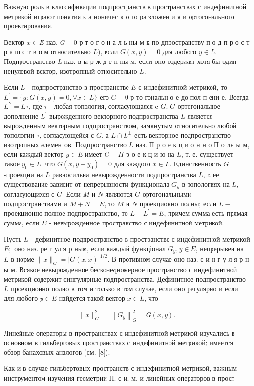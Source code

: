 \documentclass[10pt]{article}
\begin{document}
Важную роль в классификации подпространств в пространствах с индефинитной метрикой играют понятия к а ноничес к о го ра зложен и я и ортогонального проектирования.



Вектор $x \in E$ наз. $G-0$ р т о г о н а л ь ны м к по дпространству п о д п р о с т р а ш с т в о м относительно $L)$, если $G(x, y)=0$ для любого $y \in L$. Подпространство $L$ наз. в ы р ж д е н ны м, если оно содержит хотя бы один ненулевой вектор, изотропный относительно $L$.



Если $L$ - подпространство в пространстве $E$ с индефинитной метрикой, то $L^{\prime}=\{y: G(x, y)=0, \forall x \in L\}$ его $G-0$ р то гональн о е до пол п ени е. Всегда $L^{\prime \prime}=L \tau$, где $\tau$ - любая топология, согласующаяся c $G$. $G$-ортогональное дополнение $L^{\prime}$ вырожденного векторного подпространства $L$ является вырожденным векторным подпространством, замкнутым относительно любой топологии $\tau$, согласующейся с $G$, а $L \cap L^{\perp}$ есть векторное подпространство изотропных әлементов. Подпространство $L$ наз. П р о е к ц и о н н о П о лн ы м, если каждый вектор $y \in E$ имеет $G-\Pi$ р о е к ц и ю на $L$, т. е. существует такое $y_{0} \in L$, что $G\left(x, y-y_{0}\right)=0$ для каждого $x \in L$. Единственность $G$-проекции на $L$ равносильна невырожденности подпространства $L$, a ее существование зависит от непрерывности функционала $G_{y}$ в топологиях на $L$, согласующихся с $G$. Если $M$ и $N$ являются $G$-ортогональными подпространствами и $M+N=E$, то $M$ и $N$ проекционно полны; если $L-$ проекционно полное подпространство, то $L+L^{\prime}=E$, причем сумма есть прямая сумма, если $E$ - невырожденное пространство с индефинитной метрикой.



Пусть $L$ - дефинитное подпространство в пространстве с индефинитной метрикой $E ;$ оно наз. ре г ул я р ным, если каждый функціонал $G_{y}, y \in E$, непрерывен на $L$ в норме $\|x\|_{G}=|G(x, x)|^{1 / 2}$. В противном случае оно наз. с и н г у л я р н ы м. Всякое невырожденное бесконеqномерное пространство с индефинитной метрикой содержит сингулярные подпространства. Дефинитное подпространство $L$ проекционно полно в том и только в том случае, если оно регулярно и если для любого $y \in E$ найдется такой вектор $x \in L$, что



\[

\|x\|_{G}^{2}=\left\|G_{y}\right\|_{G}^{2}=G(x, y) .

\]



Линейные операторы в пространствах с индефинитной метрикой изучались в основном в гильбертовых пространствах с индефинитной метрикой; имеется обзор банаховых аналогов (см. [8]).



Как и в случае гильбертовых пространств с индефинитной метрикой, важным инструментом изучения геометрии П. с и. м. и линейных операторов в прост-
\end{document}
